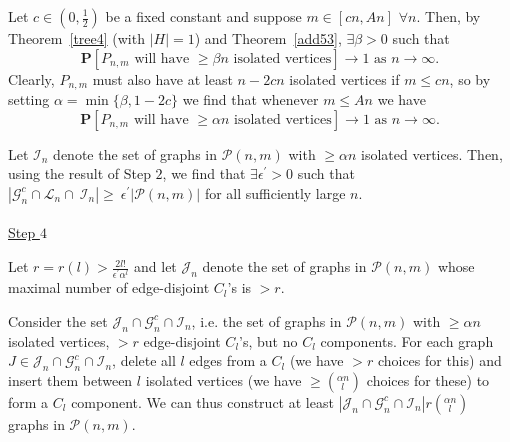 \documentclass{article}
\newtheorem{Proof of Theorem}{Proof of Theorem}
\begin{document}
Let $c \in \left( 0, \frac{1}{2} \right)$ be a fixed constant and suppose $m \in [cn,An]$ $\forall n$.
Then, by Theorem~\ref{tree4} (with $|H|=1$) and Theorem~\ref{add53},
$\exists \beta > 0$ such that
\begin{displaymath}
\mathbf{P}[P_{n,m} \textrm{ will have $\geq \beta n$ isolated vertices}] \to 1 \textrm{ as } n \to \infty.
\end{displaymath}
Clearly, $P_{n,m}$ must also have at least $n-2cn$ isolated vertices if $m \leq cn$,
so by setting $\alpha = \min \{ \beta, 1-2c \}$
we find that whenever $m \leq An$ we have
\begin{displaymath}
\mathbf{P}[P_{n,m} \textrm{ will have $\geq \alpha n$ isolated vertices}] \to 1 \textrm{ as } n \to \infty.
\end{displaymath}

Let $\mathcal{I}_{n}$ denote the set of graphs in $\mathcal{P}(n,m)$ with $\geq \alpha n$ isolated vertices.
Then, using the result of Step $2$, 
we find that $\exists \epsilon^{\prime} \!>\! 0$ such that
$|\mathcal{G}_{n}^{c} \cap \mathcal{L}_{n} \cap~\!\mathcal{I}_{n}| \!\geq~\!\!\epsilon^{\prime} |\mathcal{P}(n,m)|$
for all sufficiently large $n$. \\
\\
\underline{Step $4$}

Let $r=r(l)> \frac{2l!}{\epsilon^{\prime}\alpha^{l}}$ 
and let $\mathcal{J}_{n}$ denote the set of graphs in $\mathcal{P}(n,m)$ 
whose maximal number of edge-disjoint $C_{l}$'s is $>r$.

Consider the set $\mathcal{J}_{n} \cap \mathcal{G}_{n}^{c} \cap \mathcal{I}_{n}$,
i.e. the set of graphs in $\mathcal{P}(n,m)$ with $\geq \alpha n$ isolated vertices,
$>r$ edge-disjoint $C_{l}$'s,
but no $C_{l}$ components.
For each graph $J \in \mathcal{J}_{n} \cap \mathcal{G}_{n}^{c} \cap \mathcal{I}_{n}$,
delete all $l$ edges from a $C_{l}$ 
(we have $>r$ choices for this)
and insert them between $l$ isolated vertices
(we have $\geq \left( ^{\alpha n}_{\phantom{q}l} \right)$ choices for these)
to form a $C_{l}$ component.
We can thus construct at least 
$|\mathcal{J}_{n} \cap \mathcal{G}_{n}^{c} \cap \mathcal{I}_{n}| r \left( ^{\alpha n}_{\phantom{q}l} \right)$
graphs in $\mathcal{P}(n,m)$.
\end{document}
